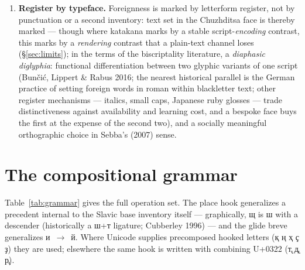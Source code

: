 \documentclass[12pt]{article}
\newcommand{\cz}[1]{{\chu #1}}
\begin{document}
\begin{enumerate}
Three properties must be kept distinct here: that a letter exists in Unicode, that it has established use in \emph{some} Cyrillic orthography, and that it will be transparently interpretable to readers of \emph{any} Cyrillic orthography. This paper demonstrates the first two — a Bulgarian reader has no prior acquaintance with Kazakh \cz{қ} or Bashkir \cz{ҙ}, and importing an attested letter buys typographic and pedagogic precedent, not automatic legibility. The third is the criterion the design aims at, and it remains an empirical claim for the reader study of \S\ref{sec:limits}.
\item \textbf{Register by typeface.} Foreignness is marked by letterform register, not by punctuation or a second inventory: text set in the Chuzhditsa face is thereby marked — though where katakana marks by a stable script-\emph{encoding} contrast, this marks by a \emph{rendering} contrast that a plain-text channel loses (\S\ref{sec:limits}); in the terms of the biscriptality literature, a \emph{diaphasic diglyphia}: functional differentiation between two glyphic variants of one script (Bun\v{c}i\'c, Lippert \& Rabus 2016; the nearest historical parallel is the German practice of setting foreign words in roman within blackletter text; other register mechanisms — italics, small caps, Japanese ruby glosses — trade distinctiveness against availability and learning cost, and a bespoke face buys the first at the expense of the second two), and a socially meaningful orthographic choice in Sebba's (2007) sense.
\end{enumerate}

\section{The compositional grammar}\label{sec:hook}

Table~\ref{tab:grammar} gives the full operation set. The place hook generalizes a precedent internal to the Slavic base inventory itself — graphically, \cz{щ} is \cz{ш} with a descender (historically a \cz{ш}+\cz{т} ligature; Cubberley 1996) — and the glide breve generalizes \cz{и}~$\rightarrow$~\cz{й}. Where Unicode supplies precomposed hooked letters (\cz{қ ң ҳ ҫ ҙ}) they are used; elsewhere the same hook is written with combining U+0322 (\cz{т̢ д̢ р̢}).
\end{document}
